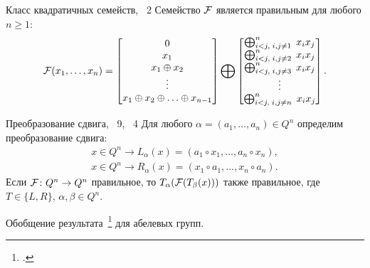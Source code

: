 \begin{frame}
    \begin{mytheorem}{Класс квадратичных семейств, \thm~2}
        Семейство $\mathcal{F}$ является правильным для любого $n \ge 1$:
        \[
            \mathcal{F}(x_1, \ldots, x_n) = 
            \begin{bmatrix}
                0 \\
                x_1 \\
                x_1 \oplus x_2 \\
                \vdots \\
                x_1 \oplus x_2 \oplus \ldots \oplus x_{n-1}
                \end{bmatrix}
                \bigoplus
                \begin{bmatrix}
                \bigoplus_{i < j, \; i, j \ne 1}^n \; x_i x_j \\
                \bigoplus_{i < j, \; i, j \ne 2}^n \; x_i x_j \\
                \bigoplus_{i < j, \; i, j \ne 3}^n \; x_i x_j \\
                \vdots \\
                \bigoplus_{i < j, \; i, j \ne n}^n \; x_i x_j \\
            \end{bmatrix}.
        \]
    \end{mytheorem}
\end{frame}


\begin{frame}
    \begin{mypropos}{Преобразование сдвига, \propos~9, \thm~4}
        \label{thm:shift}
        Для любого $\alpha = (a_1, \ldots, a_n) \in Q^n$ определим преобразование сдвига:
        \begin{gather*}
            x \in Q^n \to L_{\alpha}(x) = (a_1 \circ x_1, \ldots, a_n \circ x_n), \\
            x \in Q^n \to R_{\alpha}(x) = (x_1 \circ a_1, \ldots, x_n \circ a_n).
        \end{gather*}
        Если $\mathcal{F} \colon Q^n \to Q^n$ правильное, то $T_{\alpha}(\mathcal{F}(T_{\beta}(x)))$ также правильное, где $T \in \{L, R\}$, $\alpha, \beta \in Q^n$.
    \end{mypropos}
    Обобщение результата~\footcite{nosov06abel} для абелевых групп.
\end{frame}



